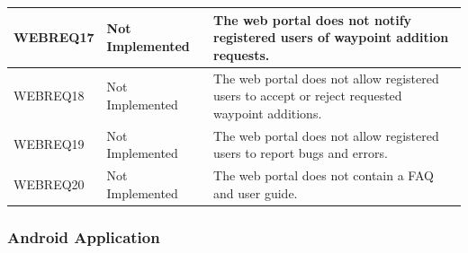\documentclass[11pt,a4paper]{article}
\begin{document}
\begin{longtable}{ p{}|p{}|p{} }
WEBREQ17 & Not Implemented & The web portal does not notify registered users of waypoint addition requests. \\ \hline
WEBREQ18 & Not Implemented & The web portal does not allow registered users to accept or reject requested waypoint additions. \\ \hline
WEBREQ19 & Not Implemented & The web portal does not allow registered users to report bugs and errors. \\ \hline
WEBREQ20 & Not Implemented & The web portal does not contain a FAQ and user guide. \\
\end{longtable}

\subsubsection{Android Application}
\label{sec:app-reqs}
\end{document}
